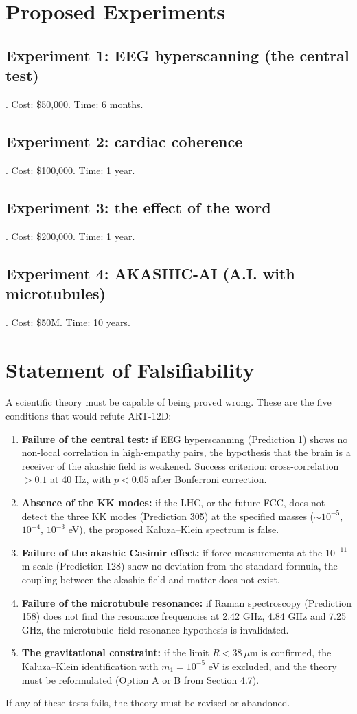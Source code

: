 \documentclass[11pt,a4paper]{article}
\begin{document}
\section{Proposed Experiments}
\subsection{Experiment 1: EEG hyperscanning (the central test)}. Cost: \$50,000. Time: 6 months.
\subsection{Experiment 2: cardiac coherence}. Cost: \$100,000. Time: 1 year.
\subsection{Experiment 3: the effect of the word}. Cost: \$200,000. Time: 1 year.
\subsection{Experiment 4: AKASHIC-AI (A.I. with microtubules)}. Cost: \$50M. Time: 10 years.

\section{Statement of Falsifiability}
A scientific theory must be capable of being proved wrong. These are the five conditions that would refute ART-12D:
\begin{enumerate}
    \item \textbf{Failure of the central test:} if EEG hyperscanning (Prediction 1) shows no non-local correlation in high-empathy pairs, the hypothesis that the brain is a receiver of the akashic field is weakened. Success criterion: cross-correlation $> 0.1$ at 40 Hz, with $p < 0.05$ after Bonferroni correction.
    \item \textbf{Absence of the KK modes:} if the LHC, or the future FCC, does not detect the three KK modes (Prediction 305) at the specified masses ($\sim 10^{-5}$, $10^{-4}$, $10^{-3}$ eV), the proposed Kaluza--Klein spectrum is false.
    \item \textbf{Failure of the akashic Casimir effect:} if force measurements at the $10^{-11}$ m scale (Prediction 128) show no deviation from the standard formula, the coupling between the akashic field and matter does not exist.
    \item \textbf{Failure of the microtubule resonance:} if Raman spectroscopy (Prediction 158) does not find the resonance frequencies at 2.42 GHz, 4.84 GHz and 7.25 GHz, the microtubule--field resonance hypothesis is invalidated.
    \item \textbf{The gravitational constraint:} if the limit $R < 38\ \mu$m is confirmed, the Kaluza--Klein identification with $m_1 = 10^{-5}$ eV is excluded, and the theory must be reformulated (Option A or B from Section 4.7).
\end{enumerate}
If any of these tests fails, the theory must be revised or abandoned.
\end{document}
